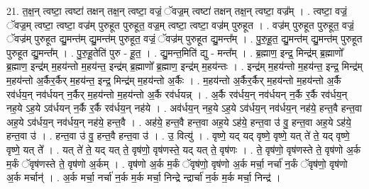 \documentclass[17pt]{extarticle}
\begin{document}
21. त॒क्ष॒न् त्वष्टा॒ त्वष्टा॑ तक्षन् तक्ष॒न् त्वष्टा॒ वज्रं॒ ॅवज्र॒म् त्वष्टा॑ तक्षन् तक्ष॒न् त्वष्टा॒ वज्र᳚म् । . त्वष्टा॒ वज्रं॒ ॅवज्र॒म् त्वष्टा॒ त्वष्टा॒ वज्र॑म् पुरुहूत पुरुहूत॒ वज्र॒म् त्वष्टा॒ त्वष्टा॒ वज्र॑म् पुरुहूत । . वज्र॑म् पुरुहूत पुरुहूत॒ वज्रं॒ ॅवज्र॑म् पुरुहूत द्यु॒मन्त॑म् द्यु॒मन्त॑म् पुरुहूत॒ वज्रं॒ ॅवज्र॑म् पुरुहूत द्यु॒मन्त᳚म् । . पु॒रु॒हू॒त॒ द्यु॒मन्त॑म् द्यु॒मन्त॑म् पुरुहूत पुरुहूत द्यु॒मन्त᳚म् । . पु॒रु॒हू॒तेति॑ पुरु - हू॒त॒ । . द्यु॒मन्त॒मिति॑ द्यु - मन्त᳚म् । . ब्र॒ह्माण॒ इन्द्र॒ मिन्द्र॑म् ब्र॒ह्माणो᳚ ब्र॒ह्माण॒ इन्द्र॑म् म॒हय॑न्तो म॒हय॑न्त॒ इन्द्र॑म् ब्र॒ह्माणो᳚ ब्र॒ह्माण॒ इन्द्र॑म् म॒हय॑न्तः । . इन्द्र॑म् म॒हय॑न्तो म॒हय॑न्त॒ इन्द्र॒ मिन्द्र॑म् म॒हय॑न्तो अ॒र्कैर॒र्कैर् म॒हय॑न्त॒ इन्द्र॒ मिन्द्र॑म् म॒हय॑न्तो अ॒र्कैः । . म॒हय॑न्तो अ॒र्कैर॒र्कैर् म॒हय॑न्तो म॒हय॑न्तो अ॒र्कै रव॑र्धय॒न् नव॑र्धयन् न॒र्कैर् म॒हय॑न्तो म॒हय॑न्तो अ॒र्कै रव॑र्धयन्न् । . अ॒र्कै रव॑र्धय॒न् नव॑र्धयन् न॒र्कै र॒र्कै रव॑र्धय॒न् नह॒ये ऽह॒ये ऽव॑र्धयन् न॒र्कै र॒र्कै रव॑र्धय॒न् नह॑ये । . अव॑र्धय॒न् नह॒ये ऽह॒ये ऽव॑र्धय॒न् नव॑र्धय॒न् नह॑ये॒ हन्त॒वै हन्त॒वा अह॒ये ऽव॑र्धय॒न् नव॑र्धय॒न् नह॑ये॒ हन्त॒वै । . अह॑ये॒ हन्त॒वै हन्त॒वा अह॒ये ऽह॑ये॒ हन्त॒वा उ॑ वु॒ हन्त॒वा अह॒ये ऽह॑ये॒ हन्त॒वा उ॑ । . हन्त॒वा उ॑ वु॒ हन्त॒वै हन्त॒वा उ॑ । . उ॒ वित्यु॑ । . वृष्णे॒ यद् यद् वृष्णे॒ वृष्णे॒ यत् ते॑ ते॒ यद् वृष्णे॒ वृष्णे॒ यत् ते᳚ । . यत् ते॑ ते॒ यद् यत् ते॒ वृष॑णो॒ वृष॑णस्ते॒ यद् यत् ते॒ वृष॑णः । . ते॒ वृष॑णो॒ वृष॑णस्ते ते॒ वृष॑णो अ॒र्क म॒र्कं ॅवृष॑णस्ते ते॒ वृष॑णो अ॒र्कम् । . वृष॑णो अ॒र्क म॒र्कं ॅवृष॑णो॒ वृष॑णो अ॒र्क मर्चा॒ नर्चा॑ न॒र्कं ॅवृष॑णो॒ वृष॑णो अ॒र्क मर्चान्॑ । . अ॒र्क मर्चा॒ नर्चा॑ न॒र्क म॒र्क मर्चा॒ निन्द्रे न्द्रार्चा॑ न॒र्क म॒र्क मर्चा॒ निन्द्र॑ । \newline
\end{document}
